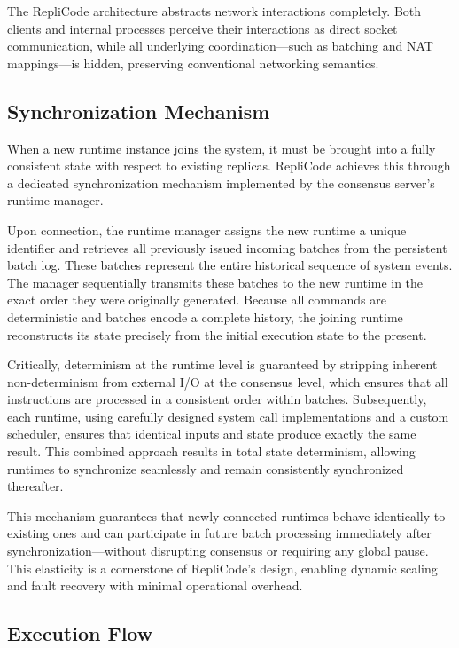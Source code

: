 \documentclass[10pt]{IEEEtran}
\begin{document}
The RepliCode architecture abstracts network interactions completely. Both clients and internal processes perceive their interactions as direct socket communication, while all underlying coordination—such as batching and NAT mappings—is hidden, preserving conventional networking semantics.

\subsection{Synchronization Mechanism}
When a new runtime instance joins the system, it must be brought into a fully consistent state with respect to existing replicas. RepliCode achieves this through a dedicated synchronization mechanism implemented by the consensus server's runtime manager.

Upon connection, the runtime manager assigns the new runtime a unique identifier and retrieves all previously issued incoming batches from the persistent batch log. These batches represent the entire historical sequence of system events. The manager sequentially transmits these batches to the new runtime in the exact order they were originally generated. Because all commands are deterministic and batches encode a complete history, the joining runtime reconstructs its state precisely from the initial execution state to the present.

Critically, determinism at the runtime level is guaranteed by stripping inherent non-determinism from external I/O at the consensus level, which ensures that all instructions are processed in a consistent order within batches. Subsequently, each runtime, using carefully designed system call implementations and a custom scheduler, ensures that identical inputs and state produce exactly the same result. This combined approach results in total state determinism, allowing runtimes to synchronize seamlessly and remain consistently synchronized thereafter.

This mechanism guarantees that newly connected runtimes behave identically to existing ones and can participate in future batch processing immediately after synchronization—without disrupting consensus or requiring any global pause. This elasticity is a cornerstone of RepliCode's design, enabling dynamic scaling and fault recovery with minimal operational overhead.

\subsection{Execution Flow}
\end{document}
